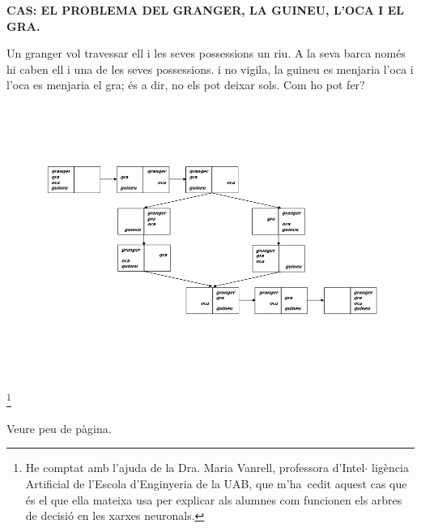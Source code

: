 \documentclass[12pt]{article}
\renewcommand{\_}{\kern-1.5pt\textunderscore\kern-1.5pt}
\begin{document}
\begin{itemize}
\vspace{\baselineskip}
\textbf{CAS: EL PROBLEMA DEL GRANGER, LA GUINEU, L’OCA I EL GRA. }\par


\vspace{\baselineskip}
\begin{justify}
Un granger vol travessar ell i les seves possessions un riu. A la seva barca només hi caben ell i una de les seves possessions. i no vigila, la guineu es menjaria l’oca i l’oca es menjaria el gra; és a dir, no els pot deixar sols. Com ho pot fer?{\fontsize{18pt}{21.6pt}\selectfont  \par}
\end{justify}\par




\begin{figure}[H]
\advance\leftskip -0.93in		\includegraphics[width=7.57in,height=3.48in]{./media/image4.png}
\end{figure}



\par


\vspace{\baselineskip}
\begin{justify}
\footnote{ He comptat amb l’ajuda de la Dra. Maria Vanrell, professora d’Intel$ \cdot $ ligència Artificial de l’Escola d’Enginyeria de la UAB, que m’ha\ cedit  aquest cas que és el que ella mateixa usa per explicar als alumnes com funcionen els arbres de decisió en les xarxes neuronals. } {\fontsize{10pt}{12.0pt}\selectfont Veure peu de pàgina. \par}
\end{justify}\par



\end{itemize}
\end{document}
